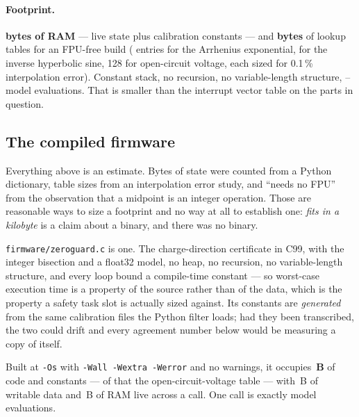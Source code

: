 \documentclass[11pt,letterpaper]{article}
\theoremstyle{definition}
\theoremstyle{remark}
\begin{document}
\paragraph{Footprint.} \textbf{\embRam{} bytes of RAM} --- live state plus \embConstants{}
calibration constants --- and \textbf{\embFlash{} bytes} of lookup tables for an FPU-free build
(\embLutExp{} entries for the Arrhenius exponential, \embLutAsinh{} for the inverse hyperbolic
sine, 128 for open-circuit voltage, each sized for 0.1\,\% interpolation error). Constant stack,
no recursion, no variable-length structure, \evalCharge{}--\evalDischarge{} model evaluations.
That is smaller than the interrupt vector table on the parts in question.



\subsection{The compiled firmware}\label{sec:firmware}

Everything above is an estimate. Bytes of state were counted from a Python dictionary, table
sizes from an interpolation error study, and ``needs no FPU'' from the observation that a
midpoint is an integer operation. Those are reasonable ways to size a footprint and no way at
all to establish one: \emph{fits in a kilobyte} is a claim about a binary, and there was no
binary.

\texttt{firmware/zeroguard.c} is one. The charge-direction certificate in C99, with the integer
bisection and a float32 model, no heap, no recursion, no variable-length structure, and every
loop bound a compile-time constant --- so worst-case execution time is a property of the source
rather than of the data, which is the property a safety task slot is actually sized against. Its
constants are \emph{generated} from the same calibration files the Python filter loads; had they
been transcribed, the two could drift and every agreement number below would be measuring a copy
of itself.

Built at \texttt{-Os} with \texttt{-Wall -Wextra -Werror} and no warnings, it occupies
\textbf{\fwText\,B} of code and constants --- \fwOcv{} of that the open-circuit-voltage table ---
with \fwData\,B of writable data and \fwRam\,B of RAM live across a call. One call is exactly
\fwEvals{} model evaluations.
\end{document}
